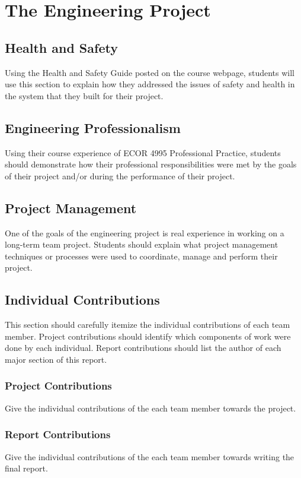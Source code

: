 \chapter{The Engineering Project}

\section{Health and Safety}

Using the Health and Safety Guide posted on the course webpage, students will use this section to explain how they addressed the issues of safety and health in the system that they built for their project.


\section{Engineering Professionalism}

Using their course experience of ECOR 4995 Professional Practice, students should demonstrate how their professional responsibilities were met by the goals of their project and/or during the performance of their project. 


\section{Project Management}

One of the goals of the engineering project is real experience in working on a long-term team project.  Students should explain what project management techniques or processes were used to coordinate, manage and perform their project.


\section{Individual Contributions}

This section should carefully itemize the individual contributions of each team member. Project contributions should identify which components of work were done by each individual.  Report contributions should list the author of each major section of this report.


\subsection{Project Contributions}

Give the individual contributions of the each team member towards the project.


\subsection{Report Contributions}

Give the individual contributions of the each team member towards writing the
final report.
